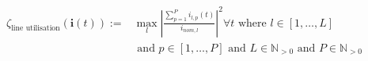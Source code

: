 \begin{equation}
\begin{split}
	\zeta_\text{line utilisation}(\textbf{i}(t)) :=& %
	\max_{l}{\left|\frac{\sum_{p=1}^{P}{i_{l,p}(t)}}{i_{nom,l}}\right|^2} \forall t \text{ where } l \in [1, \dots, L] \\
	&\text{ and } p \in [1, \dots, P] \text{ and } L \in \mathbb{N}_{>0} \text{ and } P \in \mathbb{N}_{>0}
\end{split}
\label{ch1:equ:line-utilisation}
\end{equation}